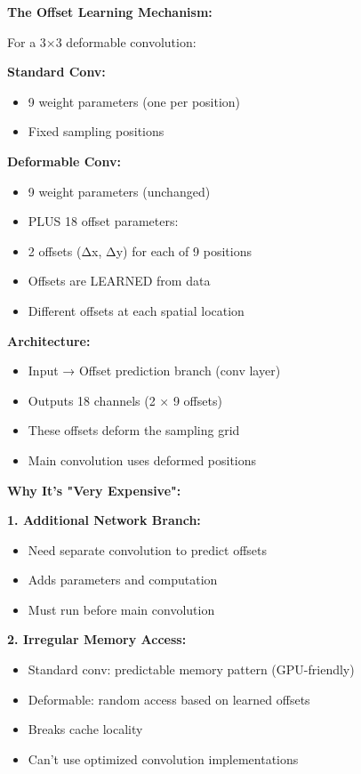 \documentclass[12pt]{article}
\newcommand{\explanation}[1]{{\color{explanationcolor}#1}}
\begin{document}
\begin{enumerate}[(a)]
{    \textbf{The Offset Learning Mechanism:}
    
    \explanation{
    For a 3×3 deformable convolution:
    
    \textbf{Standard Conv:}
    \begin{itemize}
        \item 9 weight parameters (one per position)
        \item Fixed sampling positions
    \end{itemize}
    
    \textbf{Deformable Conv:}
    \begin{itemize}
        \item 9 weight parameters (unchanged)
        \item PLUS 18 offset parameters:
        \item 2 offsets (Δx, Δy) for each of 9 positions
        \item Offsets are LEARNED from data
        \item Different offsets at each spatial location
    \end{itemize}
    
    \textbf{Architecture:}
    \begin{itemize}
        \item Input → Offset prediction branch (conv layer)
        \item Outputs 18 channels (2 × 9 offsets)
        \item These offsets deform the sampling grid
        \item Main convolution uses deformed positions
    \end{itemize}
    }
    
    \textbf{Why It's "Very Expensive":}
    
    \explanation{
    \textbf{1. Additional Network Branch:}
    \begin{itemize}
        \item Need separate convolution to predict offsets
        \item Adds parameters and computation
        \item Must run before main convolution
    \end{itemize}
    
    \textbf{2. Irregular Memory Access:}
    \begin{itemize}
        \item Standard conv: predictable memory pattern (GPU-friendly)
        \item Deformable: random access based on learned offsets
        \item Breaks cache locality
        \item Can't use optimized convolution implementations
    \end{itemize}
    
}}
\end{enumerate}
\end{document}
